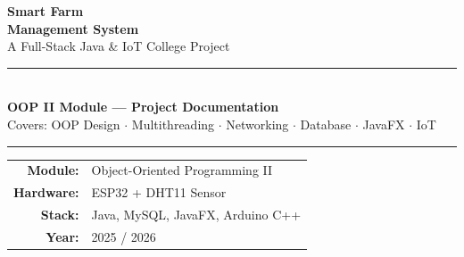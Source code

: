 \documentclass[12pt, a4paper]{report}
\begin{document}
\begin{titlepage}

\vspace*{1.5cm}
\begin{center}
    {\color{white}\fontsize{28}{34}\selectfont\bfseries Smart Farm}\\[4pt]
    {\color{white}\fontsize{22}{28}\selectfont\bfseries Management System}\\[10pt]
    {\color{white!80}\large A Full-Stack Java \& IoT College Project}

    \vspace{3.5cm}

    {\color{white}\rule{10cm}{1pt}}\\[18pt]
    {\large\bfseries\color{white} OOP II Module --- Project Documentation}\\[10pt]
    {\color{white!90} Covers: OOP Design $\cdot$ Multithreading $\cdot$ Networking $\cdot$ Database $\cdot$ JavaFX $\cdot$ IoT}\\[30pt]
    {\color{white}\rule{10cm}{1pt}}

    \vfill

    \begin{tabular}{rl}
        \textbf{Module:}   & Object-Oriented Programming II \\[4pt]
        \textbf{Hardware:} & ESP32 + DHT11 Sensor \\[4pt]
        \textbf{Stack:}    & Java, MySQL, JavaFX, Arduino C++ \\[4pt]
        \textbf{Year:}     & 2025 / 2026 \\
    \end{tabular}
\end{center}
\end{titlepage}

\tableofcontents
\newpage
\end{document}

